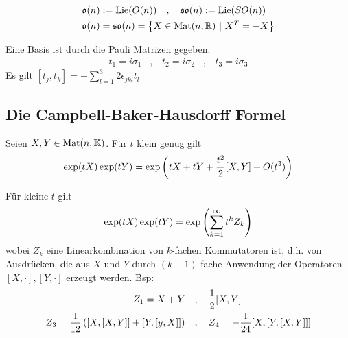 \begin{lemma}
    \begin{align*}
        &\mathfrak{o}(n) := \text{Lie}(O(n))
        \hspace{10pt} , \hspace{10pt}
        \mathfrak{so}(n) := \text{Lie}(SO(n))
        \\
        &\mathfrak{o}(n) = \mathfrak{so}(n) = \left\{ X \in \text{Mat}(n,\mathbb{R}) \ | \ X^T = - X \right\}
    \end{align*}
\end{lemma}

\begin{beispiel}[$\su(2)$]
    Eine Basis ist durch die Pauli Matrizen gegeben.
    \begin{align*}
        t_1 = i \sigma_1
        \hspace{10pt} , \hspace{10pt}
        t_2 = i \sigma_2
        \hspace{10pt} , \hspace{10pt}
        t_3 = i \sigma_3
    \end{align*}
    Es gilt $[t_j,t_k] = - \sum_{l=1}^3 2 \epsilon_{jkl} t_l$
\end{beispiel}

\subsection{Die Campbell-Baker-Hausdorff Formel}

\begin{satz}[CBH]
    Seien $X,Y \in \text{Mat}(n,\mathbb{K})$. Für $t$ klein genug gilt
    \begin{align*}
        \exp(tX) \exp(tY) = \exp \left( t X + t Y + \frac{t^2}{2} [X,Y] + O(t^3) \right)
    \end{align*}
\end{satz}

\begin{satz}
    Für kleine $t$ gilt
    \begin{align*}
        \exp(tX) \exp(tY) = \exp \left( \sum_{k=1}^\infty t^k Z_k \right)
    \end{align*}
    wobei $Z_k$ eine Linearkombination von $k$-fachen Kommutatoren ist, d.h.
    von Ausdrücken, die aus $X$ und $Y$ durch $(k-1)$-fache Anwendung der
    Operatoren $[X,\cdot],[Y,\cdot]$ erzeugt werden. Bsp:
    \begin{align*}
        Z_1 = X + Y
        \hspace{10pt} &, \hspace{10pt}
        \frac{1}{2} [X,Y]
        \\
        Z_3 = \frac{1}{12} \left( [X,[X,Y]] + [Y,[y,X]] \right)
        \hspace{10pt} &, \hspace{10pt}
        Z_4 = - \frac{1}{24} [X,[Y,[X,Y]]]
    \end{align*}
\end{satz}

